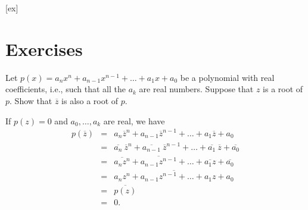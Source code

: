 [ex]
\section*{Exercises}

\begin{enumialphparenastyle}

\begin{ex}
  Let $p(x) =a_{n}x^{n}+a_{n-1}x^{n-1}+\ldots+a_{1}x+a_{0}$ be a
  polynomial with real coefficients, i.e., such that all the $a_{k}$
  are real numbers. Suppose that $z$ is a root of $p$. Show that
  $\overline{z}$ is also a root of $p$. 
  \begin{sol}
    If $p(z) =0$ and $a_0,\ldots,a_k$ are real, we have
    \begin{eqnarray*}
      p(\overline{z})
      &=& a_{n}\overline{z}^{n}+a_{n-1}\overline{z}^{n-1}+\ldots +a_{1}\overline{z}          
          +a_{0} \\
      &=&\overline{a_{n}}\ \overline{z}^{n}+\overline{a_{n-1}}\ \overline{z}                
      ^{n-1}+\ldots +\overline{a_{1}}\ \overline{z}+\overline{a_{0}}
      \\
      &=& \overline{a_{n}z^{n}}+\overline{a_{n-1}z^{n-1}}+\ldots +\overline{a_{1}z}+         
          \overline{a_{0}} \\
      &=& \overline{a_{n}z^{n}+a_{n-1}z^{n-1}+\ldots+a_{1}z+a_{0}} \\
      &=& \overline{p(z) } \\
      &=& 0.
    \end{eqnarray*}
  \end{sol}
\end{ex}

\end{enumialphparenastyle}

